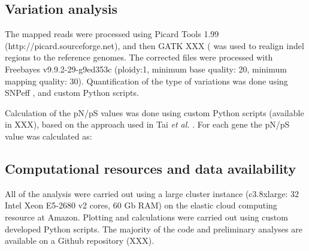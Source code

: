 \subsection{Variation analysis}

The mapped reads were processed using Picard Tools 1.99 (http://picard.sourceforge.net), and then GATK XXX (\cite{DePristo:2011fo} was used to realign indel regions to the reference genomes. The corrected files were processed with Freebayes v9.9.2-29-g9ed353c \cite{Garrison:2012wb} (ploidy:1, minimum base quality: 20, minimum mapping quality: 30). Quantification of the type of variations was done using SNPeff \cite{Cingolani:2012cz}, and custom Python scripts. 

Calculation of the pN/pS values was done using custom Python scripts (available in XXX), based on the approach used in Tai \textit{et al.} \cite{Tai:2011jo}. For each gene the pN/pS value was calculated as:

\begin{center}
\end{center}

\subsection{Computational resources and data availability}

All of the analysis were carried out using a large cluster instance (c3.8xlarge: 32 Intel Xeon E5-2680 v2 cores, 60 Gb RAM) on the elastic cloud computing resource at Amazon. Plotting and calculations were carried out using custom developed Python scripts. The majority of the code and preliminary analyses are available on a Github repository (XXX).

